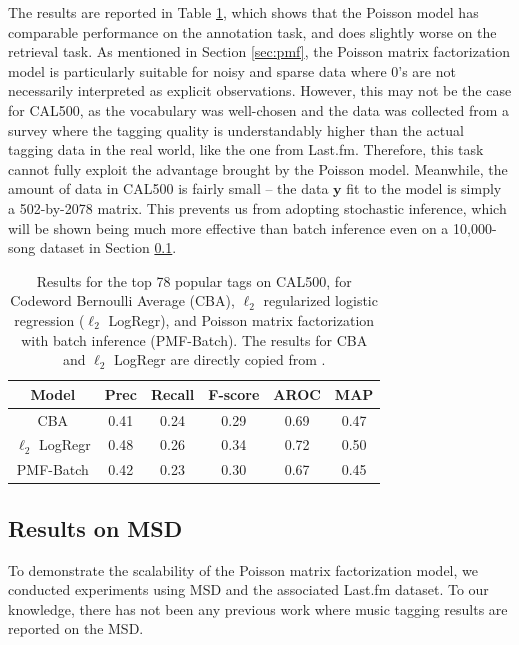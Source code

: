 The results are reported in Table \ref{tab:cal500}, which shows that the Poisson model has comparable performance on the annotation task, and does slightly worse on the retrieval task. As mentioned in Section \ref{sec:pmf}, the Poisson matrix factorization model is particularly suitable for noisy and sparse data where $0$'s are not necessarily interpreted as explicit observations. However, this may not be the case for CAL500, as the vocabulary was well-chosen and the data was collected from a survey where the tagging quality is understandably higher than the actual tagging data in the real world, like the one from Last.fm. Therefore, this task cannot fully exploit the advantage brought by the Poisson model. 
Meanwhile, the amount of data in CAL500 is fairly small -- the data $\boldsymbol{y}$ fit to the model is simply a 502-by-2078 matrix. This prevents us from adopting stochastic inference, which will  be shown being much more effective than batch inference even on a 10,000-song dataset in Section \ref{sec:msd}. 

\begin{table}
\centering
  \begin{tabular}{ c  c  c  c  c  c }
    \toprule
    Model & Prec & Recall & F-score & AROC & MAP \\ \midrule
      CBA &  0.41 & 0.24    &   0.29    &   0.69  & 0.47 \\
     $\ell_2$ LogRegr & 0.48  &  0.26  & 0.34  &  0.72 & 0.50\\
    PMF-Batch & 0.42  &  0.23 & 0.30 & 0.67 & 0.45 \\
    \bottomrule
  \end{tabular}
  \caption{Results for the top 78 popular tags on CAL500, for Codeword Bernoulli Average (CBA), $\ell_2$ regularized logistic regression ($\ell_2$ LogRegr), and Poisson matrix factorization with batch inference (PMF-Batch). The results for CBA and $\ell_2$ LogRegr are directly copied from \cite{xie2011music}.} 
  \label{tab:cal500}
\end{table}


\subsection{Results on MSD}\label{sec:msd}
To demonstrate the scalability of the Poisson matrix factorization model, we conducted experiments using MSD and the associated Last.fm dataset. To our knowledge, there has not been any previous work where music tagging results are reported on the MSD. 

